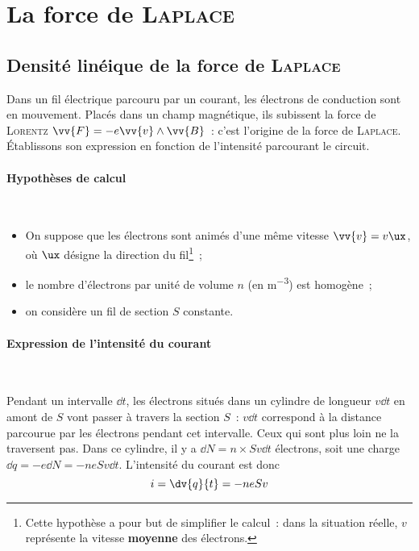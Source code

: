 \documentclass[../main/main.tex]{subfiles}
\begin{document}
\section{La force de \textsc{Laplace}}
\label{sec:flpl}
\subsection{Densité linéique de la force de \textsc{Laplace}}
\label{ssec:flplliq}
Dans un fil électrique parcouru par un courant, les électrons de conduction sont
en mouvement. Placés dans un champ magnétique, ils subissent la force de
\textsc{Lorentz} $\vv{F} = -e \vv{v}\wedge \vv{B}$~: c'est l'origine de la force
de \textsc{Laplace}. Établissons son expression en fonction de l'intensité
parcourant le circuit.

\paragraph*{Hypothèses de calcul}~
\begin{hide}
	\begin{itemize}[label=$\diamond$, leftmargin=10pt]
		\item On suppose que les électrons sont animés d'une même vitesse $\vv{v} =
			      v \ux$, où $\ux$ désigne la direction du fil\footnote{Cette hypothèse a pour
			      but de simplifier le calcul~: dans la situation réelle, $v$ représente la
			      vitesse \textbf{moyenne} des électrons.}~;
		\item le nombre d'électrons par unité de volume $n$ (en \si{m^{-3}}) est
		      homogène~;
		\item on considère un fil de section $S$ constante.
	\end{itemize}
\end{hide}

\paragraph*{Expression de l'intensité du courant}~
\begin{hide}
	Pendant un intervalle $\dd{t}$, les électrons situés dans un cylindre de
	longueur $v \dd{t}$ en amont de $S$ vont passer à travers la section $S$~: $v
		\dd{t}$ correspond à la distance parcourue par les électrons pendant cet
	intervalle. Ceux qui sont plus loin ne la traversent pas. Dans ce cylindre, il y
	a $\dd{N} = n\times Sv \dd{t}$ électrons, soit une charge $\dd{q} = -e \dd{N} =
		-neSv \dd{t}$. L'intensité du courant est donc
	\[
		i = \dv{q}{t} = -neSv
	\]
\end{hide}
\end{document}
